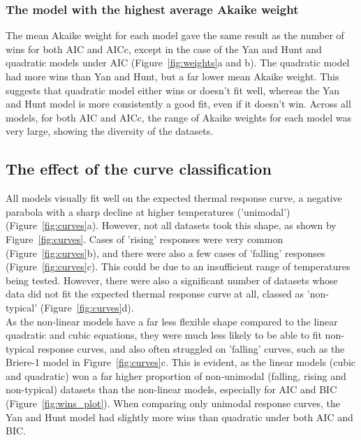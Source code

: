 \documentclass[11pt]{article}
\begin{document}
\subsubsection*{The model with the highest average Akaike weight}
The mean Akaike weight for each model gave the same result as the number of wins for both AIC and AICc, except in the case of the Yan and Hunt and quadratic models under AIC (Figure~\ref{fig:weights}a and b). The quadratic model had more wins than Yan and Hunt, but a far lower mean Akaike weight. This suggests that quadratic model either wins or doesn't fit well, whereas the Yan and Hunt model is more consistently a good fit, even if it doesn't win. Across all models, for both AIC and AICc, the range of Akaike weights for each model was very large, showing the diversity of the datasets.

\subsection{The effect of the curve classification}
All models visually fit well on the expected thermal response curve, a negative parabola with a sharp decline at higher temperatures ('unimodal') (Figure~\ref{fig:curves}a). However, not all datasets took this shape, as shown by Figure~\ref{fig:curves}. Cases of 'rising' responses were very common (Figure~\ref{fig:curves}b), and there were also a few cases of 'falling' responses (Figure~\ref{fig:curves}c). This could be due to an insufficient range of temperatures being tested. However, there were also a significant number of datasets whose data did not fit the expected thermal response curve at all, classed as 'non-typical' (Figure~\ref{fig:curves}d).
\\

As the non-linear models have a far less flexible shape compared to the linear quadratic and cubic equations, they were much less likely to be able to fit non-typical response curves, and also often struggled on 'falling' curves, such as the Briere-1 model in Figure~\ref{fig:curves}c. This is evident, as the linear models (cubic and quadratic) won a far higher proportion of non-unimodal (falling, rising and non-typical) datasets than the non-linear models, especially for AIC and BIC (Figure~\ref{fig:wins_plot}). When comparing only unimodal response curves, the Yan and Hunt model had slightly more wins than quadratic under both AIC and BIC.
\end{document}
